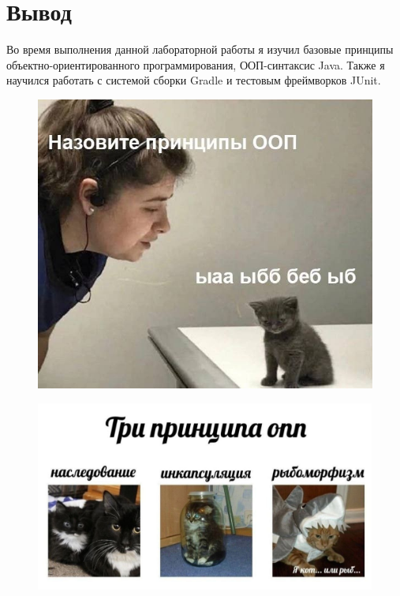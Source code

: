 \section{Вывод}
Во время выполнения данной лабораторной работы я изучил базовые принципы объектно-ориентированного программирования,
ООП-синтаксис Java. Также я научился работать с системой сборки Gradle и тестовым фреймворков JUnit.

\begin{figure}[ht]
    \centering
    \includegraphics[scale=0.3]{img/meme1.jpg}
\end{figure}
\begin{figure}[ht]
    \centering
    \includegraphics[scale=0.3]{img/meme2.jpg}
\end{figure}